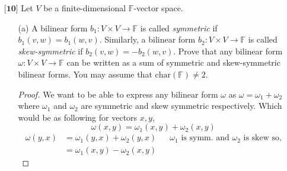 \documentclass[12pt]{article}
\begin{document}
\begin{itemize}
\begin{proof}
        Now for any transpositions of the form $(j,p)$ where $j < p$ we can write them as a composition of transpositions of the form $(j,j + 1)$ we can see this through the following,
        \[(j,p) = (j, j + 1)(j+1, j+2)(j+2, j+3)\dots (p-2, p-1)(p-1,p)(p-2,p-1)\dots (j+1,j+2)(j,j+1)\]

        Which means that any permuation can be expressed as a composition of transpositions of the form $(j,j+1)$. Since any permutation can be expressed as a composition of transpositions and any transposition can be expressed as a composition of tranpositions of the form $(j,j+1)$

        Unfortunately though this factorization is not unique. Take for example $(1234) = (14)(13)(12) = (12)(23)(34)$. THe first composition if we expand to be compositions of transpositions of the desired form we get,
        \[(14)(13)(12) = (12)(23)(34)(23)(12)(12)(23)(12)(12)\]
        The second one we get,
        \[(12)(23)(34) = (12)(23)(34)\] 

        We see they are not equal even though they ultimately result in the same permutation. Thus it is not unique. 


    \end{proof}
    
    
    \item[$\textbf{[10]}$]
    Let $V$ be a finite-dimensional $\mathbb{F}$-vector space.
    \begin{itemize}
    
    \vspace{.3cm}
    \item[(a)]
    A bilinear form $b_1: V \times V \rightarrow \mathbb{F}$ is called \textit{symmetric} if $b_1(v,w) = b_1(w,v)$. Similarly, a bilinear form $b_2: V \times V \rightarrow \mathbb{F}$ is called \textit{skew-symmetric} if $b_2(v,w) = -b_2(w,v)$. Prove that any bilinear form $\omega: V \times V \rightarrow \mathbb{F}$ can be written as a sum of symmetric and skew-symmetric bilinear forms. You may assume that $\text{char}(\mathbb{F}) \neq 2$.

    \begin{proof}
        We want to be able to express any bilinear form $\omega$ as $\omega = \omega_1 + \omega_2$ where $\omega_1$ and $\omega_2$ are symmetric and skew symmetric respectively. Which would be as following for vectors $x,y $,
        \[\omega(x,y) = \omega_1(x,y) + \omega_2(x,y)\]
        \begin{align*}
            \omega(y,x) &= \omega_1(y,x) + \omega_2(y,x) && \text{$\omega_1$ is symm. and $\omega_2$ is skew so,} \\
            &= \omega_1(x,y) - \omega_2(x,y)
        \end{align*}


\end{proof}
\end{itemize}
\end{itemize}
\end{document}
